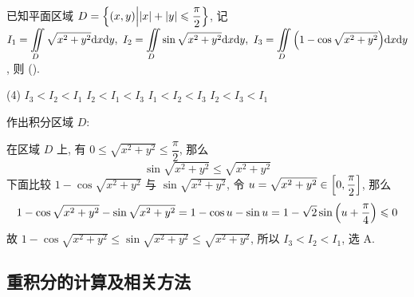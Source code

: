\begin{example}[2019 数二]
    已知平面区域 $D=\qty{(x,y)\Big| |x|+|y|\leqslant\dfrac{\pi}{2}}$, 记 $\displaystyle I_1=\iint\limits_D\sqrt{x^2+y^2}\dd x\dd y,~I_2=\iint\limits_D\sin\sqrt{x^2+y^2}\dd x\dd y,~I_3=\iint\limits_D\qty(1-\cos\sqrt{x^2+y^2})\dd x\dd y$, 则 (\quad).
    \begin{tasks}(4)
        \task $I_3<I_2<I_1$
        \task $I_2<I_1<I_3$
        \task $I_1<I_2<I_3$
        \task $I_2<I_3<I_1$
    \end{tasks}
\end{example}
\begin{solution}
    作出积分区域 $D$:\\
    \begin{minipage}{0.29\linewidth}
        \begin{figure}[H]
            \centering
            \caption{}
            \label{tikz_ercjfshuer}
        \end{figure}
    \end{minipage}\hfill
    \begin{minipage}{0.7\linewidth}
        在区域 $D$ 上, 有 $0\leqslant \sqrt{x^2+y^2}\leqslant \dfrac{\pi}{2}$, 那么 $$\sin\sqrt{x^2+y^2}\leqslant \sqrt{x^2+y^2}$$
        下面比较 $1-\cos\sqrt{x^2+y^2}$ 与 $\sin\sqrt{x^2+y^2}$, 令 $u=\sqrt{x^2+y^2}\in\qty[0,\dfrac{\pi}{2}]$, 那么
        $$1-\cos\sqrt{x^2+y^2}-\sin\sqrt{x^2+y^2}=1-\cos u-\sin u=1-\sqrt{2}\sin\qty(u+\dfrac{\pi}{4})\leqslant 0$$
        故 $1-\cos\sqrt{x^2+y^2}\leqslant \sin\sqrt{x^2+y^2}\leqslant \sqrt{x^2+y^2}$, 所以 $I_3<I_2<I_1$, 选 A.
    \end{minipage}
\end{solution}
\subsection{重积分的计算及相关方法}

